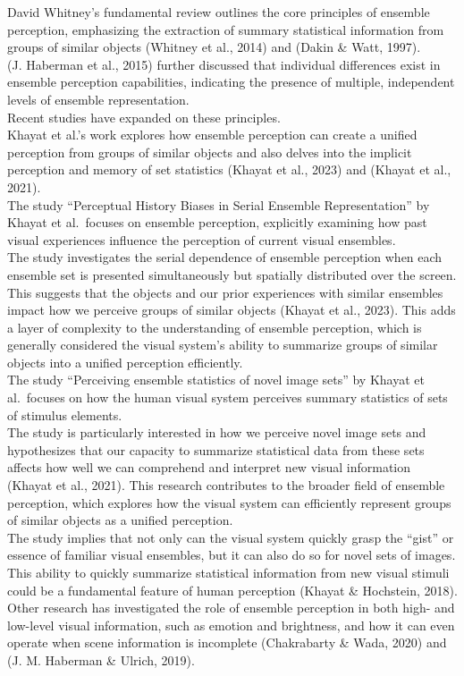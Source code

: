 \documentclass[print]{nuthesis}
\begin{document}
David Whitney's fundamental review outlines the core principles of ensemble perception, emphasizing the extraction of summary statistical information from groups of similar objects (Whitney et al., 2014) and (Dakin \& Watt, 1997).\\
(J. Haberman et al., 2015) further discussed that individual differences exist in ensemble perception capabilities, indicating the presence of multiple, independent levels of ensemble representation.\\
Recent studies have expanded on these principles.\\
Khayat et al.'s work explores how ensemble perception can create a unified perception from groups of similar objects and also delves into the implicit perception and memory of set statistics (Khayat et al., 2023) and (Khayat et al., 2021).\\
The study ``Perceptual History Biases in Serial Ensemble Representation'' by Khayat et al.~focuses on ensemble perception, explicitly examining how past visual experiences influence the perception of current visual ensembles.\\
The study investigates the serial dependence of ensemble perception when each ensemble set is presented simultaneously but spatially distributed over the screen.\\
This suggests that the objects and our prior experiences with similar ensembles impact how we perceive groups of similar objects (Khayat et al., 2023).
This adds a layer of complexity to the understanding of ensemble perception, which is generally considered the visual system's ability to summarize groups of similar objects into a unified perception efficiently.\\
The study ``Perceiving ensemble statistics of novel image sets'' by Khayat et al.~focuses on how the human visual system perceives summary statistics of sets of stimulus elements.\\
The study is particularly interested in how we perceive novel image sets and hypothesizes that our capacity to summarize statistical data from these sets affects how well we can comprehend and interpret new visual information (Khayat et al., 2021).
This research contributes to the broader field of ensemble perception, which explores how the visual system can efficiently represent groups of similar objects as a unified perception.\\
The study implies that not only can the visual system quickly grasp the ``gist'' or essence of familiar visual ensembles, but it can also do so for novel sets of images.\\
This ability to quickly summarize statistical information from new visual stimuli could be a fundamental feature of human perception (Khayat \& Hochstein, 2018).\\
Other research has investigated the role of ensemble perception in both high- and low-level visual information, such as emotion and brightness, and how it can even operate when scene information is incomplete (Chakrabarty \& Wada, 2020) and (J. M. Haberman \& Ulrich, 2019).
\end{document}
